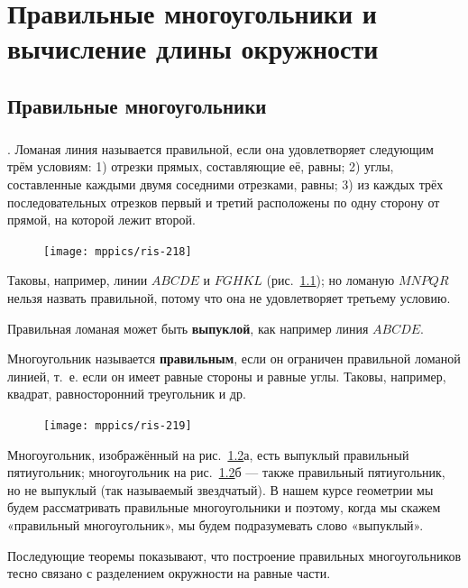 \documentclass[oneside]{book}
\begin{document}
\chapter[Правильные многоугольники]{Правильные многоугольники и вычисление длины окружности}

\section{Правильные многоугольники}

\paragraph{}\label{1938/212}
.
Ломаная линия называется правильной, если она удовлетворяет следующим трём условиям:
1) отрезки прямых, составляющие её, равны;
2) углы, составленные каждыми двумя соседними отрезками, равны;
3) из каждых трёх последовательных отрезков первый и третий расположены по одну сторону от прямой, на которой лежит второй.

\begin{figure}[h]
\centering
\texttt{[image: mppics/ris-218]}
\caption{}\label{1938/ris-218}
\end{figure}

Таковы, например, линии $ABCDE$ и $FGHKL$ (рис.~\ref{1938/ris-218});
но ломаную $MNPQR$ нельзя назвать правильной, потому что она не удовлетворяет третьему условию.

Правильная ломаная может быть \textbf{выпуклой}, как например линия $ABCDE$.

Многоугольник называется \textbf{правильным}, если он ограничен правильной ломаной линией, т.~е. если он имеет равные стороны и равные углы.
Таковы, например, квадрат, равносторонний треугольник и др. %

\begin{figure}
\centering
\texttt{[image: mppics/ris-219]}
\caption{}\label{1938/ris-219}
\end{figure}

Многоугольник, изображённый на рис.~\ref{1938/ris-219}а, есть выпуклый правильный пятиугольник;
многоугольник на рис.~\ref{1938/ris-219}б — также правильный пятиугольник, но не выпуклый (так называемый звездчатый).
В нашем курсе геометрии мы будем рассматривать  правильные многоугольники и поэтому, когда мы скажем «правильный многоугольник», мы будем подразумевать слово «выпуклый».

Последующие теоремы показывают, что построение правильных многоугольников тесно связано с разделением окружности на равные части.
\end{document}
